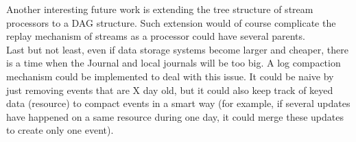 Another interesting future work is extending the tree structure of stream processors to a DAG structure. Such extension would of course complicate the replay mechanism of streams as a processor could have several parents.
\\

Last but not least, even if data storage systems become larger and cheaper, there is a time when the Journal and local journals will be too big. A log compaction mechanism could be implemented to deal with this issue. It could be naive by just removing events that are X day old, but it could also keep track of keyed data (resource) to compact events in a smart way (for example, if several updates have happened on a same resource during one day, it could merge these updates to create only one event).



